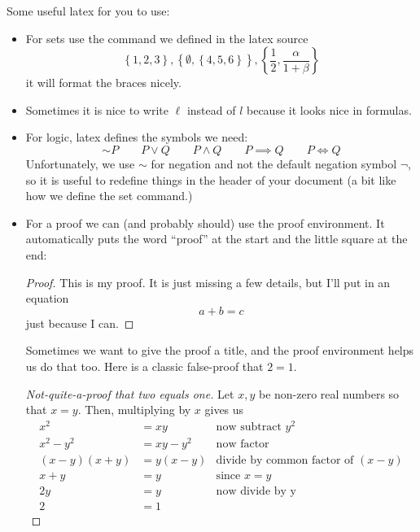 \documentclass[letterpaper,12pt]{article}
\newcommand{\set}[1]{\left\{ #1 \right\}}
\renewcommand{\neg}{\sim}
\begin{document}
Some useful latex for you to use:
\begin{itemize}

\item For sets use the command we defined in the latex source
\[ \set{1,2,3}, \set{\emptyset, \set{4,5,6} }, \set{\frac{1}{2}, \frac{\alpha}{1+\beta}} \]
it will format the braces nicely.

\item Sometimes it is nice to write \(\ell\) instead of \(l\) because it looks nice in formulas.

\item For logic, latex defines the symbols we need:
\[
\neg P \qquad
P \lor Q \qquad
P \land Q \qquad
P \implies Q \qquad
P \iff Q
\]
Unfortunately, we use $\sim$ for negation and not the default negation symbol $\lnot$, so it is useful to redefine things in the header of your document (a bit like how we define the set command.)

\item For a proof we can (and probably should) use the proof environment. It automatically puts the word ``proof'' at the start and the little square at the end:
  \begin{proof}
    This is my proof. It is just missing a few details, but I'll put
    in an equation
    \[
      a+b=c
    \]
    just because I can.
  \end{proof}
  Sometimes we want to give the proof a title, and the proof
  environment helps us do that too. Here is a classic false-proof that
  \(2=1\).
  \begin{proof}[Not-quite-a-proof that two equals one]
    Let \(x,y\) be non-zero real numbers so that \(x=y\). Then, multiplying by \(x\) gives us
    \begin{align*}
      x^2 & = xy & \text{now subtract } y^2 \\
      x^2-y^2 & = xy - y^2 & \text{now factor} \\
      (x-y)(x+y) & = y(x-y) & \text{divide by common factor of } (x-y) \\
      x+y & = y  & \text{since } x=y \\
      2y &=y & \text{now divide by y} \\
      2 &=1
    \end{align*}
  \end{proof}
  

\end{itemize}
\end{document}
